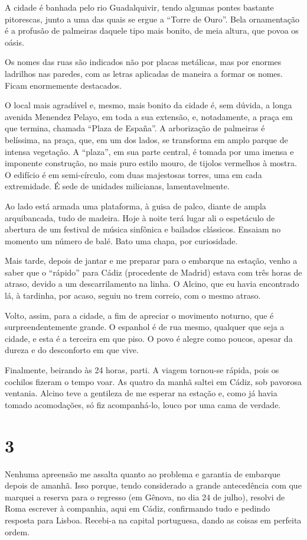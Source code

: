 A cidade é banhada pelo rio Guadalquivir, tendo algumas pontes bastante pitorescas, junto a uma das quais se ergue a ``Torre de Ouro''. Bela ornamentação é a profusão de palmeiras daquele tipo mais bonito, de meia altura, que povoa os oásis.

Os nomes das ruas são indicados não por placas metálicas, mas por enormes ladrilhos nas paredes, com as letras aplicadas de maneira a formar os nomes. Ficam enormemente destacados.

O local mais agradável e, mesmo, mais bonito da cidade é, sem dúvida, a longa avenida Menendez Pelayo, em toda a sua extensão, e, notadamente, a praça em que termina, chamada ``Plaza de España''. A arborização de palmeiras é belíssima, na praça, que, em um dos lados, se transforma em amplo parque de intensa vegetação. A ``plaza'', em sua parte central, é tomada por uma imensa e imponente construção, no mais puro estilo mouro, de tijolos vermelhos à mostra. O edifício é em semi-círculo, com duas majestosas torres, uma em cada extremidade. É sede de unidades milicianas, lamentavelmente.

Ao lado está armada uma plataforma, à guisa de palco, diante de ampla arquibancada, tudo de madeira. Hoje à noite terá lugar ali o espetáculo de abertura de um festival de música sinfônica e bailados clássicos. Ensaiam no momento um número de balé. Bato uma chapa, por curiosidade.

Mais tarde, depois de jantar e me preparar para o embarque na estação, venho a saber que o ``rápido'' para Cádiz (procedente de Madrid) estava com três horas de atraso, devido a um descarrilamento na linha. O Alcino, que eu havia encontrado lá, à tardinha, por acaso, seguiu no trem correio, com o mesmo atraso.

Volto, assim, para a cidade, a fim de apreciar o movimento noturno, que é surpreendentemente grande. O espanhol é de rua mesmo, qualquer que seja a cidade, e esta é a terceira em que piso. O povo é alegre como poucos, apesar da dureza e do desconforto em que vive.

Finalmente, beirando às 24 horas, parti. A viagem tornou-se rápida, pois os cochilos fizeram o tempo voar. As quatro da manhã saltei em Cádiz, sob pavorosa ventania. Alcino teve a gentileza de me esperar na estação e, como já havia tomado acomodações, só fiz acompanhá-lo, louco por uma cama de verdade.

\section*{3 \adfflatleafright {}}
Nenhuma apreensão me assalta quanto ao problema e garantia de embarque depois de amanhã. Isso porque, tendo considerado a grande antecedência com que marquei a reserva para o regresso (em Gênova, no dia 24 de julho), resolvi de Roma escrever à companhia, aqui em Cádiz, confirmando tudo e pedindo resposta para Lisboa. Recebi-a na capital portuguesa, dando as coisas em perfeita ordem.

